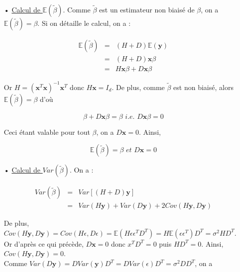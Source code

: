 \documentclass[a4paper, 10pt]{article}
\newcommand{\E}{\mathbb{E}}
\begin{document}
\begin{itemize}

	\item[•] \underline{Calcul de $\E \left( \tilde{\beta} \right)$}. Comme $\tilde{\beta}$ est un estimateur non biaisé de $\beta$, on a $\E \left( \tilde{\beta} \right) = \beta$. Si on détaille le calcul, on a : 

\[ \begin{array}{ccc} 
\E \left( \tilde{\beta} \right) & = & \left( H + D \right) \E \left( \textbf{y} \right) \\
 & = & \left( H + D \right) \textbf{x} \beta \,\,\,\,\,\, \\
 & = & H\textbf{x}\beta + D\textbf{x}\beta \,\,\,\, \end{array} \]

Or $H = \left( \textbf{x}^{T} \textbf{x} \right)^{-1}\textbf{x}^{T}$ donc $H \textbf{x} = I_{d}$. De plus, comme $\tilde{\beta}$ est non biaisé, alors $\E \left( \tilde{\beta} \right) = \beta$ d'où 

\[ \beta + D \textbf{x} \beta = \beta \,\, i.e. \,\, D \textbf{x} \beta = 0 \]

Ceci étant valable pour tout $\beta$, on a $D \textbf{x} = 0$. Ainsi,

\[ \boxed{\E \left( \tilde{\beta} \right) = \beta \,\, et \,\, D \textbf{x} = 0} \]

	\item[•] \underline{Calcul de $Var \left( \tilde{\beta} \right)$}. On a :
	
\[ \begin{array}{ccc} 
Var \left( \tilde{\beta} \right) & = & Var \left[ \left( H + D \right) \textbf{y} \right] \,\,\,\,\,\,\,\,\,\,\,\,\,\,\,\,\,\,\,\,\,\,\,\,\,\,\,\,\,\,\,\,\,\,\,\,\,\,\,\,\,\,\,\,\,\,\,\,\,\,\,\,\,\,\,\,\,\,\,\,\,\,\,  \\
 & = & Var \left( H \textbf{y} \right) + Var \left( D \textbf{y} \right) + 2 Cov \left( H \textbf{y}, D \textbf{y} \right) \end{array} \]

De plus, $Cov \left( H \textbf{y}, D \textbf{y} \right) = Cov \left( H \epsilon, D \epsilon \right) = \E \left( H \epsilon \epsilon^{T} D^{T} \right) = H \E \left( \epsilon \epsilon^{T} \right) D^{T} = \sigma^{2}H D^{T}$. Or d'après ce qui précède, $D \textbf{x} = 0$ donc $x^{T} D^{T} = 0$ puis $H D^{T} = 0$. Ainsi, $Cov \left( H \textbf{y}, D \textbf{y} \right) = 0$. \\

\noindent Comme $Var \left( D \textbf{y} \right) = D Var \left( \textbf{y} \right) D^{T} = D Var \left( \epsilon \right) D^{T} = \sigma^{2} DD^{T}$, on a 


\end{itemize}
\end{document}
